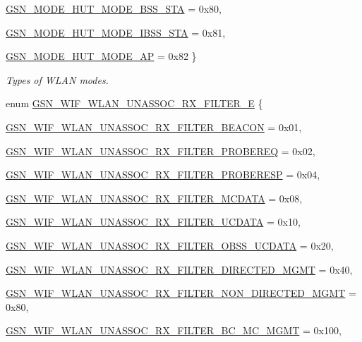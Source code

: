 \begin{DoxyCompactItemize}
\par
\hyperlink{a00640_gga8d2c2dc6c9f7927c5cf4634d7b403b95a2dfea59dcf8f2cc5cf5563dd98062949}{GSN\_\-MODE\_\-HUT\_\-MODE\_\-BSS\_\-STA} =  0x80, 
\par
\hyperlink{a00640_gga8d2c2dc6c9f7927c5cf4634d7b403b95a5c1af84ee44deddd78424d6649351d5c}{GSN\_\-MODE\_\-HUT\_\-MODE\_\-IBSS\_\-STA} =  0x81, 
\par
\hyperlink{a00640_gga8d2c2dc6c9f7927c5cf4634d7b403b95ad385a9345a8b96725314fefa76e307ad}{GSN\_\-MODE\_\-HUT\_\-MODE\_\-AP} =  0x82
 \}
\begin{DoxyCompactList}\small\item\em Types of WLAN modes. \end{DoxyCompactList}\item 
enum \hyperlink{a00677_gaca8dae165f1024726492234d64d1bb26}{GSN\_\-WIF\_\-WLAN\_\-UNASSOC\_\-RX\_\-FILTER\_\-E} \{ \par
\hyperlink{a00677_gaca8dae165f1024726492234d64d1bb26a508860aba80550da910c89a17ff6670f}{GSN\_\-WIF\_\-WLAN\_\-UNASSOC\_\-RX\_\-FILTER\_\-BEACON} = 0x01, 
\par
\hyperlink{a00677_gaca8dae165f1024726492234d64d1bb26aae40247fb2bf5be904c7f8935850e7ca}{GSN\_\-WIF\_\-WLAN\_\-UNASSOC\_\-RX\_\-FILTER\_\-PROBEREQ} = 0x02, 
\par
\hyperlink{a00677_gaca8dae165f1024726492234d64d1bb26a37446aa1d6147d7d37dedd056cd821ff}{GSN\_\-WIF\_\-WLAN\_\-UNASSOC\_\-RX\_\-FILTER\_\-PROBERESP} = 0x04, 
\par
\hyperlink{a00677_gaca8dae165f1024726492234d64d1bb26a3249da7fef3a050b53653a55e1fd38de}{GSN\_\-WIF\_\-WLAN\_\-UNASSOC\_\-RX\_\-FILTER\_\-MCDATA} = 0x08, 
\par
\hyperlink{a00677_gaca8dae165f1024726492234d64d1bb26a19ed4b07a7c985ec19ad9a53062526e2}{GSN\_\-WIF\_\-WLAN\_\-UNASSOC\_\-RX\_\-FILTER\_\-UCDATA} = 0x10, 
\par
\hyperlink{a00677_gaca8dae165f1024726492234d64d1bb26a6479db92f4f370cbb2068926d8de1e3e}{GSN\_\-WIF\_\-WLAN\_\-UNASSOC\_\-RX\_\-FILTER\_\-OBSS\_\-UCDATA} = 0x20, 
\par
\hyperlink{a00677_gaca8dae165f1024726492234d64d1bb26af8775826813c36b8c1598ae6879cfba0}{GSN\_\-WIF\_\-WLAN\_\-UNASSOC\_\-RX\_\-FILTER\_\-DIRECTED\_\-MGMT} =  0x40, 
\par
\hyperlink{a00677_gaca8dae165f1024726492234d64d1bb26af317c471e0b75c590a52ab43b240c9ab}{GSN\_\-WIF\_\-WLAN\_\-UNASSOC\_\-RX\_\-FILTER\_\-NON\_\-DIRECTED\_\-MGMT} =  0x80, 
\par
\hyperlink{a00677_gaca8dae165f1024726492234d64d1bb26a1fececaa8e82e17ef671ac741ede8145}{GSN\_\-WIF\_\-WLAN\_\-UNASSOC\_\-RX\_\-FILTER\_\-BC\_\-MC\_\-MGMT} =  0x100, 

\end{DoxyCompactItemize}
